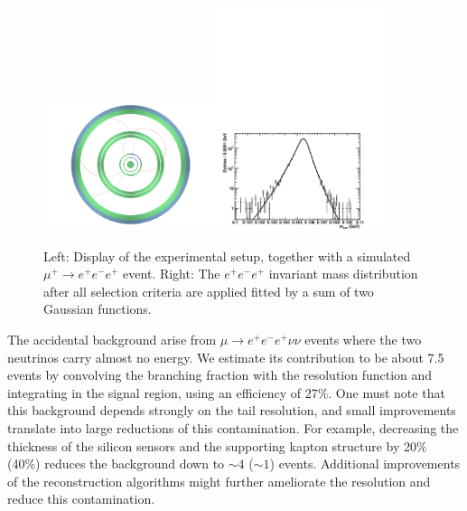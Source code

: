\begin{figure}[htb]
\begin{center}
\includegraphics[width=0.45\textwidth]{ChargedLeptons/Figures/event.pdf}\includegraphics[width=0.45\textwidth]{ChargedLeptons/Figures/resoFit.pdf}
\end{center}
\caption{Left: Display of the experimental setup, together with a simulated $\mu^+ \rightarrow e^+e^-e^+$ event. 
Right:  The $e^+e^-e^+$ invariant mass distribution after all selection criteria are applied fitted by a 
sum of two Gaussian functions.}
\label{Fig::mu3e}
\end{figure}

The accidental background arise from $\mu \rightarrow e^+e^-e^+ \nu\nu$ events where the two neutrinos carry almost no energy. We estimate its contribution to be about 7.5 events by convolving the branching fraction with the resolution function and integrating in the signal region, using an efficiency of 27\%. One must note that this background depends strongly on the tail resolution, and small improvements translate into large reductions of this contamination. For example, decreasing the thickness of the silicon sensors and the supporting kapton structure by 20\% (40\%) reduces the background down to $\sim 4$ ($\sim 1$) events. Additional improvements of the reconstruction algorithms might further ameliorate the resolution and reduce this contamination.

